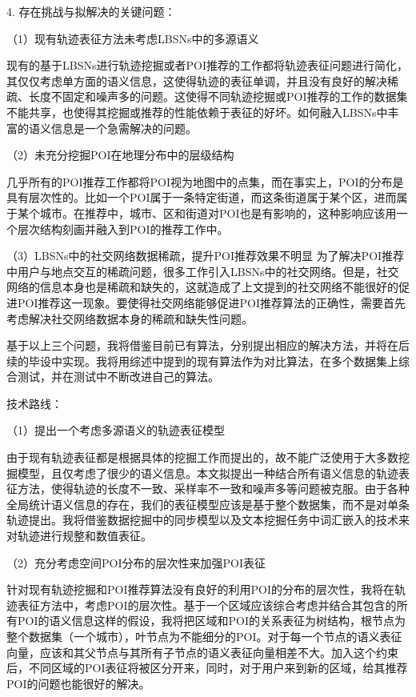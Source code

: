\documentclass[a4paper,11pt]{article}
\theoremstyle{mytheor}
\begin{document}
4. 存在挑战与拟解决的关键问题：

（1）现有轨迹表征方法未考虑LBSNs中的多源语义

现有的基于LBSNs进行轨迹挖掘或者POI推荐的工作都将轨迹表征问题进行简化，其仅仅考虑单方面的语义信息，这使得轨迹的表征单调，并且没有良好的解决稀疏、长度不固定和噪声多的问题。这使得不同轨迹挖掘或POI推荐的工作的数据集不能共享，也使得其挖掘或推荐的性能依赖于表征的好坏。如何融入LBSNs中丰富的语义信息是一个急需解决的问题。

（2）未充分挖掘POI在地理分布中的层级结构

几乎所有的POI推荐工作都将POI视为地图中的点集，而在事实上，POI的分布是具有层次性的。比如一个POI属于一条特定街道，而这条街道属于某个区，进而属于某个城市。在推荐中，城市、区和街道对POI也是有影响的，这种影响应该用一个层次结构刻画并融入到POI的推荐工作中。

（3）LBSNs中的社交网络数据稀疏，提升POI推荐效果不明显
为了解决POI推荐中用户与地点交互的稀疏问题，很多工作引入LBSNs中的社交网络。但是，社交网络的信息本身也是稀疏和缺失的，这就造成了上文提到的社交网络不能很好的促进POI推荐这一现象。要使得社交网络能够促进POI推荐算法的正确性，需要首先考虑解决社交网络数据本身的稀疏和缺失性问题。


基于以上三个问题，我将借鉴目前已有算法，分别提出相应的解决方法，并将在后续的毕设中实现。我将用综述中提到的现有算法作为对比算法，在多个数据集上综合测试，并在测试中不断改进自己的算法。


技术路线：

（1）提出一个考虑多源语义的轨迹表征模型

由于现有轨迹表征都是根据具体的挖掘工作而提出的，故不能广泛使用于大多数挖掘模型，且仅考虑了很少的语义信息。本文拟提出一种结合所有语义信息的轨迹表征方法，使得轨迹的长度不一致、采样率不一致和噪声多等问题被克服。由于各种全局统计语义信息的存在，我们的表征模型应该是基于整个数据集，而不是对单条轨迹提出。我将借鉴数据挖掘中的同步模型\cite{DBLP:journals/tkde/ShaoHBYP13,shao2015community,shao2016scalable,shao2017robust,shao2017Cosync}以及文本挖掘任务中词汇嵌入的技术\cite{bengio2003neural,collobert2011natural,mikolov2013distributed,pennington2014glove}来对轨迹进行规整和数值表征。

（2）充分考虑空间POI分布的层次性来加强POI表征

针对现有轨迹挖掘和POI推荐算法没有良好的利用POI的分布的层次性，我将在轨迹表征方法中，考虑POI的层次性。基于一个区域应该综合考虑并结合其包含的所有POI的语义信息这样的假设，我将把区域和POI的关系表征为树结构，根节点为整个数据集（一个城市），叶节点为不能细分的POI。对于每一个节点的语义表征向量，应该和其父节点与其所有子节点的语义表征向量相差不大。加入这个约束后，不同区域的POI表征将被区分开来，同时，对于用户来到新的区域，给其推荐POI的问题也能很好的解决。
\end{document}

